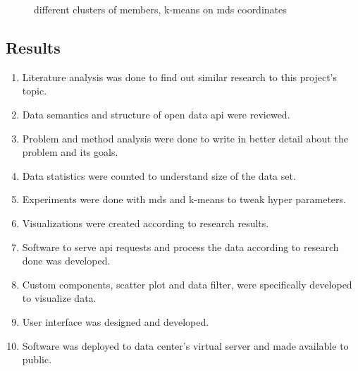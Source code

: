 \documentclass[a4paper,12pt]{article}
\begin{document}
\begin{figure}[!tbp]
		\hfill
		
		\caption{different clusters of members, \gls{k-means} on \acrshort{mds} coordinates}
	\end{figure}
	
	\clearpage
	
	\subsection{Results}
	
	\begin{enumerate}
		\item Literature analysis was done to find out similar research to this project's topic.
		\item Data semantics and structure of open data \acrshort{api} were reviewed.
		\item Problem and method analysis were done to write in better detail about the problem and its goals.
		\item Data statistics were counted to understand size of the data set.
		\item Experiments were done with \acrshort{mds} and \acrshort{k-means} to tweak hyper parameters.
		\item Visualizations were created according to research results.
		\item Software to serve \acrshort{api} requests and process the data according to research done was developed.
		\item Custom components, scatter plot and data filter, were  specifically developed to visualize data.
		\item User interface was designed and developed.
		\item Software was deployed to data center's virtual server and made available to public.
	\end{enumerate}
	
\end{document}
